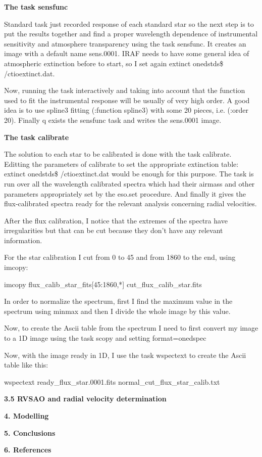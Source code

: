 \documentclass[english]{article}
\begin{document}
\textbf{The task sensfunc}

Standard task just recorded response of each standard star so the next step is to put the results together and find a proper wavelength dependence of instrumental sensitivity and atmosphere transparency using the task sensfunc. It creates an image with a default name sens.0001. IRAF needs to have some general idea of atmospheric extinction before to start, so I set again extinct onedstds\$ /ctioextinct.dat.

Now, running the task interactively and taking into account that the function used to fit the instrumental response will be usually of very high order. A good idea is to use spline3 fitting (:function spline3) with some 20 pieces, i.e. (:order 20).
Finally q exists the sensfunc task and writes the sens.0001 image.

\textbf{The task calibrate}

The solution to each star to be calibrated is done with the task calibrate. Editting the parameters of calibrate to set the appropriate extinction table: extinct onedstds\$ /ctioextinct.dat would be enough for this purpose. The task is run over all the wavelength calibrated spectra which had their airmass and other parameters appropriately set by the eso.set procedure. And finally it gives the flux-calibrated spectra ready for the relevant analysis concerning radial velocities.

After the flux calibration, I notice that the extremes of the spectra have irregularities but that can be cut because they don't have any relevant information.

For the star calibration I cut from 0 to 45 and from 1860 to the end, using imcopy:

\begin{center}
imcopy flux\_calib\_star\_fits[45:1860,*] cut\_flux\_calib\_star.fits
\end{center}

In order to normalize the spectrum, first I find the maximum value in the spectrum using minmax and then I divide the whole image by this value.

Now, to create the Ascii table from the spectrum I need to first convert my image to a 1D image using the task scopy and setting format=onedspec

Now, with the image ready in 1D, I use the task wspectext to create the Ascii table like this:

\begin{center}
wspectext ready\_flux\_star.0001.fits normal\_cut\_flux\_star\_calib.txt
\end{center}

\textbf{{\Large 3.5 RVSAO and radial velocity determination}}



\textbf{{\LARGE 4. Modelling}}



\textbf{{\LARGE 5. Conclusions}}



\textbf{{\LARGE 6. References}}
\end{document}
